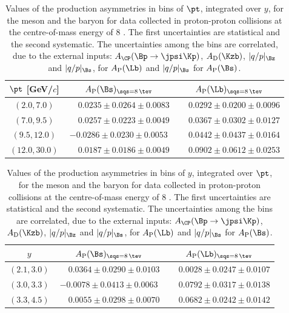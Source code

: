 \begin{table}
\caption{Values of the production asymmetries in bins of $\pt$, integrated over $y$, for the \Bs meson and the \Lb baryon for data collected in proton-proton collisions at the centre-of-mass energy of  8 \tev. The first uncertainties are statistical and the second systematic. The uncertainties among the bins are correlated, due to the external inputs: $A_{\CP}(\Bp\to\jpsi\Kp)$, $A_{\rm D}(\Kzb)$, $|q/p|_{\Bz}$ and $|q/p|_{\Bs}$, for $A_{\rm P}(\Lb)$  and $|q/p|_{\Bs}$ for $A_{\rm P}(\Bs)$. }
\label{tab:AP_BsLb_2012_pt}
\begin{center}
\begin{tabular}{c|c|c}
$\pt$ [GeV/$c$]& $A_{\rm P}(\Bs)_{\sqs = 8\, \tev}$ & $A_{\rm P}(\Lb)_{\sqs = 8\, \tev}$ \\
\hline
$(2.0,   7.0)$   &  $\phantom{-}0.0235  \pm  0.0264  \pm  0.0083$  &  $  \phantom{-}0.0292 \pm 0.0200 \pm 0.0096  $  \\
$(7.0,   9.5)$   &  $\phantom{-}0.0257  \pm  0.0223  \pm  0.0049$  &  $  \phantom{-}0.0367 \pm 0.0302 \pm 0.0127  $  \\
$(9.5,   12.0)$  &  $-0.0286            \pm  0.0230  \pm  0.0053$  &  $  \phantom{-}0.0442 \pm 0.0437 \pm 0.0164  $  \\
$(12.0,  30.0)$  &  $\phantom{-}0.0187  \pm  0.0186  \pm  0.0049$  &  $  \phantom{-}0.0902 \pm 0.0612 \pm 0.0253  $  \\
\end{tabular}
\end{center}
\end{table}

\begin{table}
\caption{Values of the production asymmetries in bins of $y$, integrated over $\pt$, for the \Bs meson and the \Lb baryon for data collected in proton-proton collisions at the centre-of-mass energy of  8 \tev. The first uncertainties are statistical and the second systematic. The uncertainties among the bins are correlated, due to the external inputs: $A_{\CP}(\Bp\to\jpsi\Kp)$, $A_{\rm D}(\Kzb)$, $|q/p|_{\Bz}$ and $|q/p|_{\Bs}$, for $A_{\rm P}(\Lb)$  and $|q/p|_{\Bs}$ for $A_{\rm P}(\Bs)$. }
\label{tab:AP_BsLb_2012_eta}
\begin{center}
\begin{tabular}{c|c|c}
$y$& $A_{\rm P}(\Bs)_{\sqs = 8\, \tev}$ & $A_{\rm P}(\Lb)_{\sqs = 8\, \tev}$ \\
\hline
$(2.1,  3.0)$  &  $\phantom{-}0.0364  \pm  0.0290  \pm  0.0103$  &  $ \phantom{-}0.0028 \pm 0.0247 \pm 0.0107  $  \\
$(3.0,  3.3)$  &  $-0.0078            \pm  0.0413  \pm  0.0063$  &  $  \phantom{-}0.0792 \pm 0.0317 \pm 0.0138  $  \\
$(3.3,  4.5)$  &  $\phantom{-}0.0055  \pm  0.0298  \pm  0.0070$  &  $  \phantom{-}0.0682 \pm 0.0242 \pm 0.0142  $  \\
\end{tabular}
\end{center}
\end{table}


